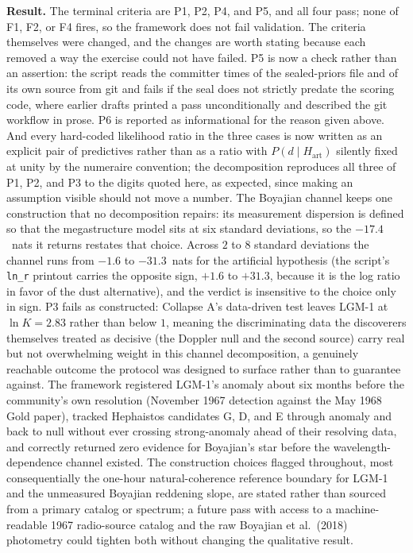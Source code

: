 \documentclass[11pt]{article}
\newcommand{\lnK}{\ensuremath{\ln K}}
\begin{document}
\textbf{Result.} The terminal criteria are P1, P2, P4, and P5, and all four pass; none of F1, F2, or F4 fires, so the framework does not fail validation. The criteria themselves were changed, and the changes are worth stating because each removed a way the exercise could not have failed. P5 is now a check rather than an assertion: the script reads the committer times of the sealed-priors file and of its own source from git and fails if the seal does not strictly predate the scoring code, where earlier drafts printed a pass unconditionally and described the git workflow in prose. P6 is reported as informational for the reason given above. And every hard-coded likelihood ratio in the three cases is now written as an explicit pair of predictives rather than as a ratio with $P(d \mid H_{\mathrm{art}})$ silently fixed at unity by the numeraire convention; the decomposition reproduces all three of P1, P2, and P3 to the digits quoted here, as expected, since making an assumption visible should not move a number. The Boyajian channel keeps one construction that no decomposition repairs: its measurement dispersion is defined so that the megastructure model sits at six standard deviations, so the $-17.4$~nats it returns restates that choice. Across $2$ to $8$ standard deviations the channel runs from $-1.6$ to $-31.3$~nats for the artificial hypothesis (the script's \texttt{ln\_r} printout carries the opposite sign, $+1.6$ to $+31.3$, because it is the log ratio in favor of the dust alternative), and the verdict is insensitive to the choice only in sign. P3 fails as constructed: Collapse A's data-driven test leaves LGM-1 at $\lnK = 2.83$ rather than below $1$, meaning the discriminating data the discoverers themselves treated as decisive (the Doppler null and the second source) carry real but not overwhelming weight in this channel decomposition, a genuinely reachable outcome the protocol was designed to surface rather than to guarantee against. The framework registered LGM-1's anomaly about six months before the community's own resolution (November 1967 detection against the May 1968 Gold paper), tracked Hephaistos candidates G, D, and E through anomaly and back to null without ever crossing strong-anomaly ahead of their resolving data, and correctly returned zero evidence for Boyajian's star before the wavelength-dependence channel existed. The construction choices flagged throughout, most consequentially the one-hour natural-coherence reference boundary for LGM-1 and the unmeasured Boyajian reddening slope, are stated rather than sourced from a primary catalog or spectrum; a future pass with access to a machine-readable 1967 radio-source catalog and the raw Boyajian et al.\ (2018) photometry could tighten both without changing the qualitative result.
\end{document}
